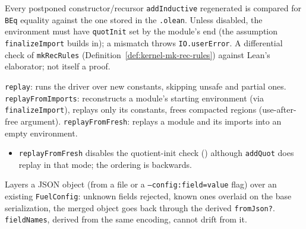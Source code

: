 \begin{definition}
\label{family:kernel-replay-postponed}
\leanok
{}
 Every postponed constructor/recursor \texttt{addInductive} regenerated is compared
for \texttt{BEq} equality against the one stored in the \texttt{.olean}. Unless disabled, the
environment must have \texttt{quotInit} set by the module's end (the assumption
\texttt{finalizeImport} builds in); a mismatch throws \texttt{IO.userError}. A differential check
of \texttt{mkRecRules} (Definition~\ref{def:kernel-mk-rec-rules}) against Lean's elaborator; not
itself a proof.
\end{definition}

\begin{definition}
\label{def:kernel-replay-entrypoints}
\leanok
{}
 \texttt{replay}: runs the driver over new constants, skipping unsafe and partial
ones. \texttt{replayFromImports}: reconstructs a module's starting environment (via
\texttt{finalizeImport}), replays only its constants, frees compacted regions
(use-after-free argument). \texttt{replayFromFresh}: replays a module and its imports into an
empty environment.
\begin{itemize}
\item {} \texttt{replayFromFresh} disables the quotient-init check
() although \texttt{addQuot} does replay in that mode; the
ordering is backwards.
\end{itemize}
\end{definition}

\begin{definition}
\label{family:kernel-fuelconfig-cli}
\leanok
{}
 Layers a JSON object (from a file or a \texttt{--config:field=value} flag) over an
existing \texttt{FuelConfig}: unknown fields rejected, known ones overlaid on the base
serialization, the merged object goes back through the derived \texttt{fromJson?}.
\texttt{fieldNames}, derived from the same encoding, cannot drift from it.
\end{definition}

